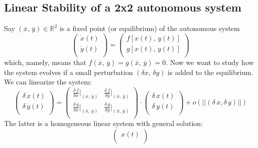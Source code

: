 \subsection*{Linear Stability of a 2x2 autonomous system}
\label{app:bifurcation_diagram}
{\small
Say $(\overline{x},\, \overline{y})\in \mathbb{R}^2$ is a fixed point (or equilibrium) of the autonomous system 
\begin{equation*}
    \begin{pmatrix}
        \dot{x}(t) \\
        \dot{y}(t) \\
    \end{pmatrix}
    = 
        \begin{pmatrix}
        f[x(t),\, y(t)] \\
        g[x(t),\, y(t)] \\
    \end{pmatrix}
\end{equation*}
which, namely, means that $f(\overline{x},\, \overline{y}) = g(\overline{x},\, \overline{y}) = 0$. Now we want to study how the system evolves if a small perturbation $(\delta x,\, \delta y)$ is added to the equilibrium. We can linearize the system:
\begin{equation*}
    \begin{pmatrix}
        \delta\,\dot{x}(t) \\
        \delta\,\dot{y}(t) \\
    \end{pmatrix}
    = 
        \begin{pmatrix}
        \frac{\delta\,f}{\delta x}|_{(\overline{x},\,\overline{y})} & \frac{\delta\,f}{\delta y}|_{(\overline{x},\,\overline{y})}\\
        \frac{\delta\,g}{\delta x}|_{(\overline{x},\,\overline{y})} & \frac{\delta\,g}{\delta y}|_{(\overline{x},\,\overline{y})} \\
    \end{pmatrix}
    \cdot
        \begin{pmatrix}
        \delta\,x(t) \\
        \delta\,y(t) \\
    \end{pmatrix}
    +
    o(||(\delta\,x, \delta\,y)||)
\end{equation*}
 The latter is a homogeneous linear system with general solution:
\begin{equation*}
        \begin{pmatrix}
        x(t) \\

\end{pmatrix}
\end{equation*}}
